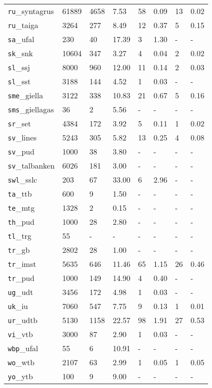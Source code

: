 \begin{longtable}{|l|l|l|l|l|l|l|l|}
\texttt{ru}\_syntagrus & 61889 & 4658 & 7.53 & 58 & 0.09 & 13 & 0.02\\
\texttt{ru}\_taiga & 3264 & 277 & 8.49 & 12 & 0.37 & 5 & 0.15\\
\texttt{sa}\_ufal & 230 & 40 & 17.39 & 3 & 1.30 & - & -\\
\texttt{sk}\_snk & 10604 & 347 & 3.27 & 4 & 0.04 & 2 & 0.02\\
\texttt{sl}\_ssj & 8000 & 960 & 12.00 & 11 & 0.14 & 2 & 0.03\\
\texttt{sl}\_sst & 3188 & 144 & 4.52 & 1 & 0.03 & - & -\\
\texttt{sme}\_giella & 3122 & 338 & 10.83 & 21 & 0.67 & 5 & 0.16\\
\texttt{sms}\_giellagas & 36 & 2 & 5.56 & - & - & - & -\\
\texttt{sr}\_set & 4384 & 172 & 3.92 & 5 & 0.11 & 1 & 0.02\\
\texttt{sv}\_lines & 5243 & 305 & 5.82 & 13 & 0.25 & 4 & 0.08\\
\texttt{sv}\_pud & 1000 & 38 & 3.80 & - & - & - & -\\
\texttt{sv}\_talbanken & 6026 & 181 & 3.00 & - & - & - & -\\
\texttt{swl}\_sslc & 203 & 67 & 33.00 & 6 & 2.96 & - & -\\
\texttt{ta}\_ttb & 600 & 9 & 1.50 & - & - & - & -\\
\texttt{te}\_mtg & 1328 & 2 & 0.15 & - & - & - & -\\
\texttt{th}\_pud & 1000 & 28 & 2.80 & - & - & - & -\\
\texttt{tl}\_trg & 55 & - & - & - & - & - & -\\
\texttt{tr}\_gb & 2802 & 28 & 1.00 & - & - & - & -\\
\texttt{tr}\_imst & 5635 & 646 & 11.46 & 65 & 1.15 & 26 & 0.46\\
\texttt{tr}\_pud & 1000 & 149 & 14.90 & 4 & 0.40 & - & -\\
\texttt{ug}\_udt & 3456 & 172 & 4.98 & 1 & 0.03 & - & -\\
\texttt{uk}\_iu & 7060 & 547 & 7.75 & 9 & 0.13 & 1 & 0.01\\
\texttt{ur}\_udtb & 5130 & 1158 & 22.57 & 98 & 1.91 & 27 & 0.53\\
\texttt{vi}\_vtb & 3000 & 87 & 2.90 & 1 & 0.03 & - & -\\
\texttt{wbp}\_ufal & 55 & 6 & 10.91 & - & - & - & -\\
\texttt{wo}\_wtb & 2107 & 63 & 2.99 & 1 & 0.05 & 1 & 0.05\\
\texttt{yo}\_ytb & 100 & 9 & 9.00 & - & - & - & -\\

\end{longtable}
